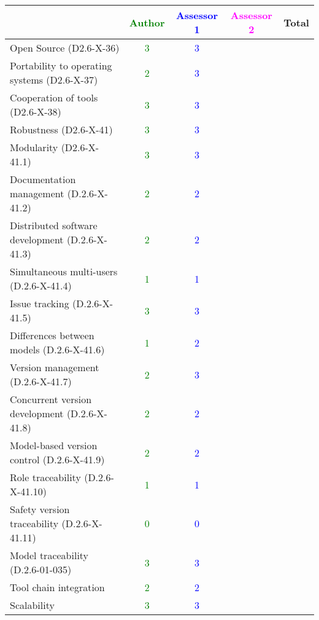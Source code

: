 \begin{tabular}{|l | c | c | c | c|}
\hline
& \textcolor{green}{Author} & \textcolor{blue}{Assessor 1} & \textcolor{magenta}{Assessor 2} & Total \\
\hline 
Open Source (D2.6-X-36) & \textcolor{green}{3} & \textcolor{blue}{3} & &  \\
\hline 
Portability to operating systems (D2.6-X-37) & \textcolor{green}{2} & \textcolor{blue}{3} & &  \\
\hline
Cooperation of tools (D2.6-X-38) & \textcolor{green}{3} & \textcolor{blue}{3} & &  \\
\hline
Robustness (D2.6-X-41) & \textcolor{green}{3} & \textcolor{blue}{3} & & \\
\hline
Modularity (D2.6-X-41.1) & \textcolor{green}{3} & \textcolor{blue}{3} & & \\
\hline
Documentation management (D.2.6-X-41.2) & \textcolor{green}{2} & \textcolor{blue}{2} & & \\
\hline
Distributed software development (D.2.6-X-41.3)  & \textcolor{green}{2} & \textcolor{blue}{2} & & \\
\hline
Simultaneous multi-users (D.2.6-X-41.4)   & \textcolor{green}{1} & \textcolor{blue}{1} & & \\
\hline
Issue tracking (D.2.6-X-41.5) & \textcolor{green}{3} & \textcolor{blue}{3} & & \\
\hline
Differences between models (D.2.6-X-41.6) & \textcolor{green}{1} & \textcolor{blue}{2} & & \\
\hline
Version management (D.2.6-X-41.7) & \textcolor{green}{2} & \textcolor{blue}{3} & & \\
\hline
Concurrent version development (D.2.6-X-41.8) & \textcolor{green}{2} & \textcolor{blue}{2} & & \\
\hline
Model-based version control (D.2.6-X-41.9) & \textcolor{green}{2} & \textcolor{blue}{2} & & \\
\hline
Role traceability (D.2.6-X-41.10) & \textcolor{green}{1} & \textcolor{blue}{1} & & \\
\hline
Safety version traceability (D.2.6-X-41.11) & \textcolor{green}{0} & \textcolor{blue}{0} & & \\
\hline
Model traceability (D.2.6-01-035) & \textcolor{green}{3} & \textcolor{blue}{3} & & \\
\hline
Tool chain integration & \textcolor{green}{2} & \textcolor{blue}{2} & & \\
\hline
Scalability & \textcolor{green}{3} & \textcolor{blue}{3} & & \\
\hline
\end{tabular}

